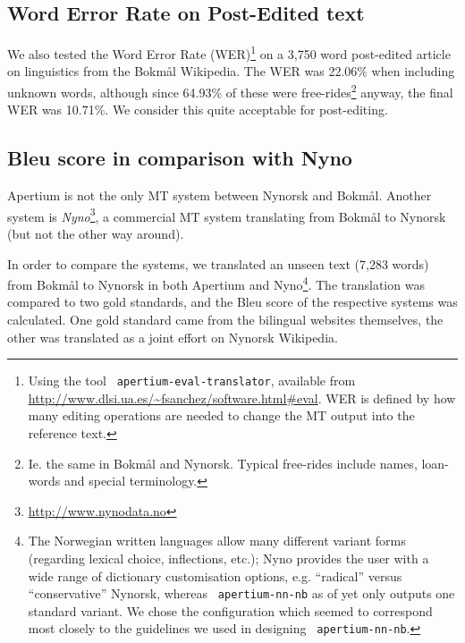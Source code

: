 \documentclass[11pt]{article}
\newcommand{\comment}[1]{\textbf{SKRIV} {\it #1}}
\renewcommand{\comment}[1]{}
\begin{document}
\subsection{Word Error Rate on Post-Edited text}
\label{sec:WER}
We also tested the Word Error Rate (WER)\footnote{Using the tool {\tt
    \small apertium-eval-translator}, available from
  \href{http://www.dlsi.ua.es/~fsanchez/software.html\#eval}{http://www.dlsi.ua.es/\~{}fsanchez/software.html\#eval}. WER
  is defined by how many editing operations are needed to change the
  MT output into the reference text.}
on a 3,750 word post-edited
article on linguistics from the Bokmål Wikipedia. The WER was 22.06\%
when including unknown words, although since 64.93\% of these were
free-rides\footnote{Ie. the same in Bokmål and Nynorsk. Typical
  free-rides include names, loan-words and special terminology.}
anyway, the final WER was 10.71\%. We consider this quite acceptable
for post-editing.

\comment{More WER explanation? Levenshtein/Edit distance, substitution/insertion/deletion? Or a citation instead?}

\subsection{{\sc Bleu} score in comparison with Nyno}

Apertium is not the only MT system between Nynorsk and Bokmål. Another
system is
\textit{Nyno}\footnote{\href{http://www.nynodata.no}{http://www.nynodata.no}},
a commercial MT system translating from Bokmål to Nynorsk (but not the
other way around). 

In order to compare the systems, we translated an unseen text (7,283
words) from Bokmål to Nynorsk in both Apertium and Nyno\footnote{The
  Norwegian written languages allow many different variant forms
  (regarding lexical choice, inflections, etc.); Nyno provides the
  user with a wide range of dictionary customisation options,
  e.g. ``radical'' versus ``conservative'' Nynorsk, whereas {\tt \small 
    apertium-nn-nb} as of yet only outputs one standard variant. We
  chose the \comment{standard/XYZ-}configuration which seemed to
  correspond most closely to the guidelines we used in designing {\tt \small 
    apertium-nn-nb}.}. The translation was compared to two gold
standards, and the {\sc Bleu} score \citep{papineni2001bleu} of the
respective systems was calculated. One gold standard came from the
bilingual websites themselves, the other was translated as a joint 
effort on Nynorsk Wikipedia.
\end{document}
